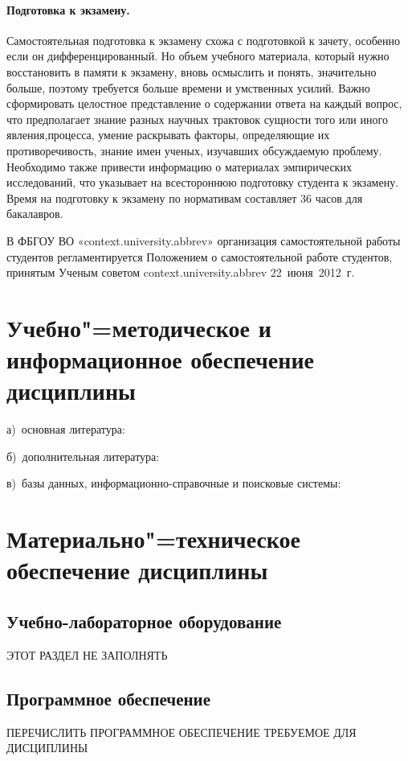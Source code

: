 \documentclass[12pt]{scrartcl}
\begin{document}
\paragraph{Подготовка к экзамену.} Самостоятельная подготовка к экзамену схожа с
подготовкой к зачету, особенно если он дифференцированный. Но объем учебного
материала, который нужно восстановить в памяти к экзамену, вновь осмыслить и понять,
значительно больше, поэтому требуется больше времени и умственных усилий. Важно
сформировать целостное представление о содержании ответа на каждый вопрос, что
предполагает знание разных научных трактовок сущности того или иного явления,процесса, умение раскрывать факторы, определяющие их противоречивость, знание имен
ученых, изучавших обсуждаемую проблему. Необходимо также привести информацию о
материалах эмпирических исследований, что указывает на всестороннюю подготовку
студента к экзамену. Время на подготовку к экзамену по нормативам составляет 36 часов
для бакалавров.

В ФБГОУ ВО «{{context.university.abbrev}}» организация самостоятельной работы студентов
регламентируется Положением о самостоятельной работе студентов, принятым Ученым
советом {{context.university.abbrev}} 22~июня~2012~г.

\section{Учебно"=методическое и информационное обеспечение дисциплины}
\noindent а)\ основная литература:

\noindent б)\ дополнительная литература:

\noindent в)\ базы данных, информационно-справочные и поисковые системы:

\section{Материально"=техническое обеспечение дисциплины}

\subsection{Учебно-лабораторное оборудование}

ЭТОТ РАЗДЕЛ НЕ ЗАПОЛНЯТЬ

\subsection{Программное обеспечение}

ПЕРЕЧИСЛИТЬ ПРОГРАММНОЕ ОБЕСПЕЧЕНИЕ ТРЕБУЕМОЕ ДЛЯ ДИСЦИПЛИНЫ
\end{document}
